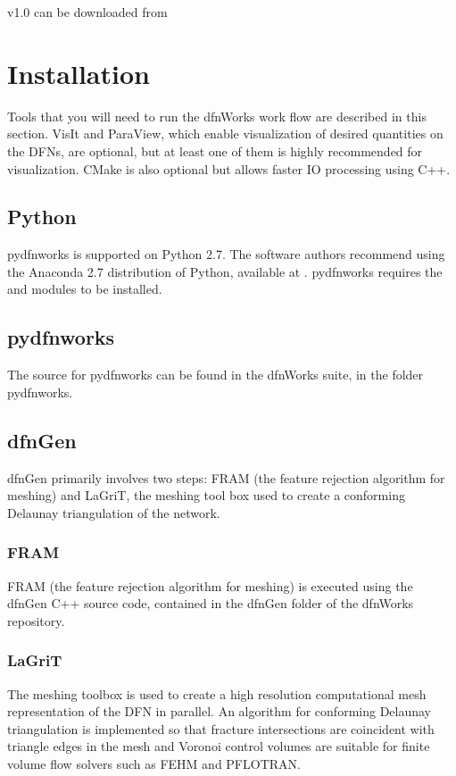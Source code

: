 \documentclass[letterpaper,10pt,english]{sphinxmanual}
\begin{document}
v1.0 can be downloaded from 


\section{Installation}
\label{\detokenize{intro:installation}}
Tools that you will need to run the dfnWorks work flow are described in
this section. VisIt and ParaView, which enable visualization of desired
quantities on the DFNs, are optional, but at least one of them is highly
recommended for visualization. CMake is also optional but allows faster IO
processing using C++.


\subsection{Python}
\label{\detokenize{intro:python}}
pydfnworks is supported on Python 2.7. The software authors recommend using
the Anaconda 2.7 distribution of Python, available at .
pydfnworks requires the  and  modules to be installed.


\subsection{pydfnworks}
\label{\detokenize{intro:pydfnworks}}
The source for pydfnworks can be found in the dfnWorks suite, in the folder
pydfnworks.


\subsection{dfnGen}
\label{\detokenize{intro:dfngen}}
dfnGen primarily involves two steps: FRAM (the feature rejection algorithm for meshing) and LaGriT, the meshing tool box used to create a
conforming Delaunay triangulation of the network.


\subsubsection{FRAM}
\label{\detokenize{intro:fram}}
FRAM (the feature rejection algorithm for meshing) is executed using the
dfnGen C++ source code, contained in the dfnGen folder of the dfnWorks repository.


\subsubsection{LaGriT}
\label{\detokenize{intro:lagrit}}
The  meshing toolbox is used to create a high resolution computational
mesh representation of the DFN in parallel. An algorithm for conforming
Delaunay triangulation is implemented so that fracture intersections are
coincident with triangle edges in the mesh and Voronoi control volumes are
suitable for finite volume flow solvers such as FEHM and PFLOTRAN.
\end{document}
